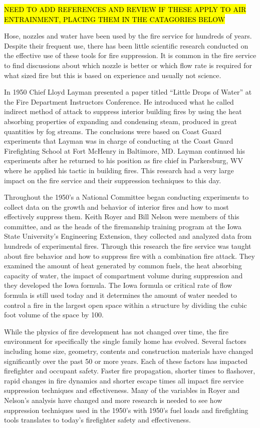 \documentclass[12pt,oneside]{book}
\begin{document}
\hl{NEED TO ADD REFERENCES AND REVIEW IF THESE APPLY TO AIR ENTRAINMENT, PLACING THEM IN THE CATAGORIES BELOW}

Hose, nozzles and water have been used by the fire service for hundreds of years. Despite their frequent use, there has been little scientific research conducted on the effective use of these tools for fire suppression. It is common in the fire service to find discussions about which nozzle is better or which flow rate is required for what sized fire but this is based on experience and usually not science. 

In 1950 Chief Lloyd Layman presented a paper titled “Little Drops of Water” at the Fire Department Instructors Conference. He introduced what he called indirect method of attack to suppress interior building fires by using the heat absorbing properties of expanding and condensing steam, produced in great quantities by fog streams. The conclusions were based on Coast Guard experiments that Layman was in charge of conducting at the Coast Guard Firefighting School at Fort McHenry in Baltimore, MD. Layman continued his experiments after he returned to his position as fire chief in Parkersburg, WV where he applied his tactic in building fires.  This research had a very large impact on the fire service and their suppression techniques to this day. 

Throughout the 1950’s a National Committee began conducting experiments to collect data on the growth and behavior of interior fires and how to most effectively suppress them. Keith Royer and Bill Nelson were members of this committee, and as the heads of the firemanship training program at the Iowa State University’s Engineering Extension, they collected and analyzed data from hundreds of experimental fires. Through this research the fire service was taught about fire behavior and how to suppress fire with a combination fire attack. They examined the amount of heat generated by common fuels, the heat absorbing capacity of water, the impact of compartment volume during suppression and they developed the Iowa formula. The Iowa formula or critical rate of flow formula is still used today and it determines the amount of water needed to control a fire in the largest open space within a structure by dividing the cubic foot volume of the space by 100.

While the physics of fire development has not changed over time, the fire environment for specifically the single family home has evolved. Several factors including home size, geometry, contents and construction materials have changed significantly over the past 50 or more years. Each of these factors has impacted firefighter and occupant safety. Faster fire propagation, shorter times to flashover, rapid changes in fire dynamics and shorter escape times all impact fire service suppression techniques and effectiveness. Many of the variables in Royer and Nelson’s analysis have changed and more research is needed to see how suppression techniques used in the 1950’s with 1950’s fuel loads and firefighting tools translates to today’s firefighter safety and effectiveness.
\end{document}
